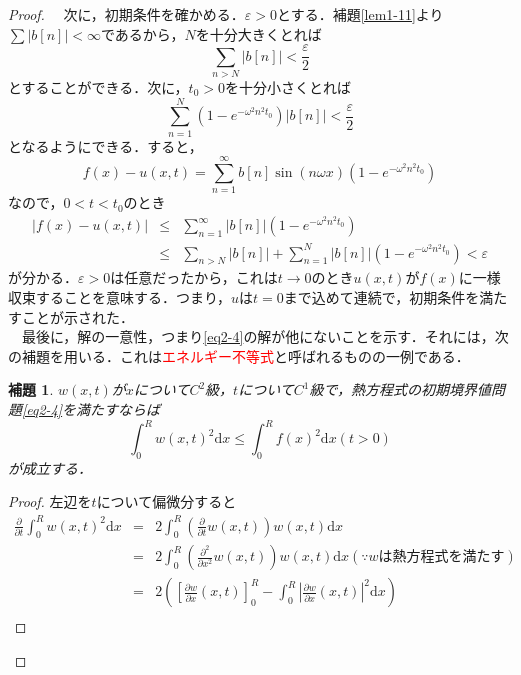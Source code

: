 \documentclass[a4j]{jsbook}
\newtheorem{lemma}[theorem]{補題}
\numberwithin{theorem}{chapter}  %
\begin{document}
\begin{proof}
　次に，初期条件を確かめる．\(\varepsilon>0\)とする．補題\ref{lem1-11}より\(\displaystyle\sum |b[n]|<\infty\)であるから，\(N\)を十分大きくとれば
\begin{equation*}
    \sum_{n>N}|b[n]|<\frac{\varepsilon}{2}
\end{equation*}
とすることができる．次に，\(t_0>0\)を十分小さくとれば
\begin{equation*}
    \sum_{n=1}^N\left(1-e^{-\omega^2 n^2t_0}\right)|b[n]|<\frac{\varepsilon}{2}
\end{equation*}
となるようにできる．すると，
\begin{equation*}
    f(x)-u(x, t)=\sum_{n=1}^\infty b[n]\sin(n\omega x)\left(1-e^{-\omega^2 n^2t_0}\right)
\end{equation*}
なので，\(0<t<t_0\)のとき
\begin{eqnarray*}
|f(x)-u(x, t)|&\leq&\sum_{n=1}^\infty |b[n]|\left(1-e^{-\omega^2 n^2t_0}\right) \\
&\leq&\sum_{n>N}|b[n]|+\sum_{n=1}^N |b[n]|\left(1-e^{-\omega^2 n^2t_0}\right)<\varepsilon
\end{eqnarray*}
が分かる．\(\varepsilon>0\)は任意だったから，これは\(t\to 0\)のとき\(u(x, t)\)が\(f(x)\)に一様収束することを意味する．つまり，\(u\)は\(t=0\)まで込めて連続で，初期条件を満たすことが示された．\\
　最後に，解の一意性，つまり\eqref{eq2-4}の解が他にないことを示す．それには，次の補題を用いる．これは\textcolor{red}{エネルギー不等式}と呼ばれるものの一例である．
\begin{lemma}
\label{lem2-7}
\(w(x, t)\)が\(x\)について\(C^2\)級，\(t\)について\(C^1\)級で，熱方程式の初期境界値問題\eqref{eq2-4}を満たすならば
\begin{equation}
    \int_0^R w(x, t)^2\mathrm{d}x\leq\int_0^R f(x)^2\mathrm{d}x (t>0) \label{eq2-8}
\end{equation}
が成立する．
\end{lemma}
\begin{proof}
左辺を\(t\)について偏微分すると
\begin{eqnarray*}
\frac{\partial}{\partial t}\int_0^R w(x, t)^2\mathrm{d}x&=&2\int_0^R\left(\frac{\partial}{\partial t}w(x, t)\right)w(x, t)\mathrm{d}x \\
&=&2\int_0^R\left(\frac{\partial^2}{\partial x^2}w(x, t)\right)w(x, t)\mathrm{d}x (\because w\mbox{は熱方程式を満たす}) \\
&=&2\left(\left[\frac{\partial w}{\partial x}(x, t)\right]_0^R-\int_0^R\left|\frac{\partial w}{\partial x}(x, t)\right|^2\mathrm{d}x\right) \\

\end{eqnarray*}
\end{proof}
\end{proof}
\end{document}
